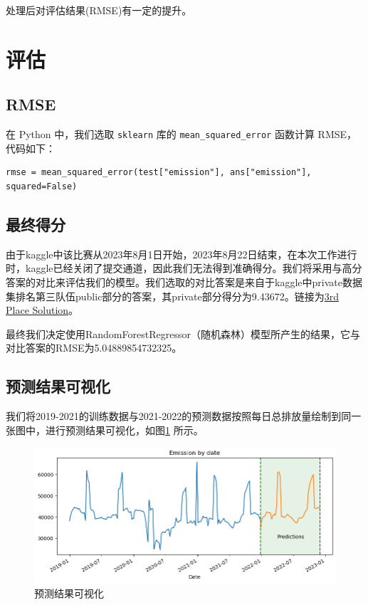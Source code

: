 \documentclass{ctexart}
\begin{document}
处理后对评估结果(RMSE)有一定的提升。

\section{评估}

\subsection{RMSE}

在 Python 中，我们选取 \texttt{sklearn} 库的 \texttt{mean\_squared\_error} 函数计算 RMSE，代码如下：

\begin{lstlisting}[style=Python]
      rmse = mean_squared_error(test["emission"], ans["emission"], squared=False)
\end{lstlisting}

\subsection{最终得分}

由于kaggle中该比赛从2023年8月1日开始，2023年8月22日结束，在本次工作进行时，kaggle已经关闭了提交通道，因此我们无法得到准确得分。我们将采用与高分答案的对比来评估我们的模型。我们选取的对比答案是来自于kaggle中private数据集排名第三队伍public部分的答案，其private部分得分为9.43672。链接为\href{https://www.kaggle.com/competitions/playground-series-s3e20/discussion/433822}{3rd Place Solution}。

最终我们决定使用RandomForestRegressor（随机森林）模型所产生的结果，它与对比答案的RMSE为5.04889854732325。

\subsection{预测结果可视化}

我们将2019-2021的训练数据与2021-2022的预测数据按照每日总排放量绘制到同一张图中，进行预测结果可视化，如图\ref{fig:13} 所示。

\begin{figure}[H]
      \centering
      \includegraphics[width=1\textwidth]{output13.png}
      \caption{预测结果可视化}
      \label{fig:13}
\end{figure}
\end{document}
